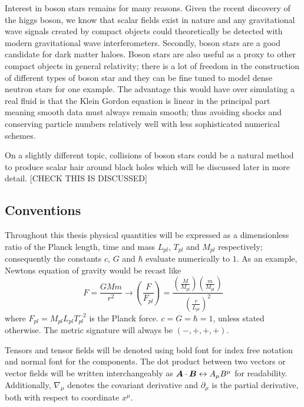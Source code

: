 Interest in boson stars remains for many reasons. Given the recent discovery of the higgs boson, we know that scalar fields exist in nature and any gravitational wave signals created by compact objects could theoretically be detected with modern gravitational wave interferometers. Secondly, boson stars are a good candidate for dark matter haloes. Boson stars are also useful as a proxy to other compact objects in general relativity; there is a lot of freedom in the construction of different types of boson star and they can be fine tuned to model dense neutron stars for one example. The advantage this would have over simulating a real fluid is that the Klein Gordon equation is linear in the principal part meaning smooth data must always remain smooth; thus avoiding shocks and conserving particle numbers relatively well with less sophisticated numerical schemes. 

On a slightly different topic, collisions of boson stars could be a natural method to produce scalar hair around black holes which will be discussed later in more detail. [CHECK THIS IS DISCUSSED]

\subsection{Conventions} \label{intro:sec:conventions}
Throughout this thesis physical quantities will be expressed as a dimensionless ratio of the Planck length, time and mass $L_{pl}$, $T_{pl}$ and $M_{pl}$ respectively; consequently the constants $c$, $G$ and $\hbar$ evaluate numerically to $1$. As an example, Newtons equation of gravity would be recast like
\begin{equation}
F = \frac{G M m}{r^2} \rightarrow \left(\frac{F}{F_{pl}} \right)=\frac{\left(\frac{M}{M_{pl}} \right)\left(\frac{m}{M_{pl}} \right)  }{\left(\frac{r}{L_{pl}} \right)^2}
\end{equation}
where $F_{pl} = M_{pl}L_{pl}T_{pl}^{-2}$ is the Planck force.
$c=G=\hbar=1$, unless stated otherwise. The metric signature will always be $(-,+,+,+)$. 

Tensors and tensor fields will be denoted using bold font for
index free notation and normal font for the components.
The dot product between two vectors or vector fields will be written interchangeably as $\boldsymbol{A} \cdot \boldsymbol{B} \leftrightarrow {A}_\mu {B}^\mu$ for readability.
Additionally, $\nabla_\mu$ denotes the covariant derivative and $\partial_\mu$
is the partial derivative, both with respect to coordinate $x^\mu$.

